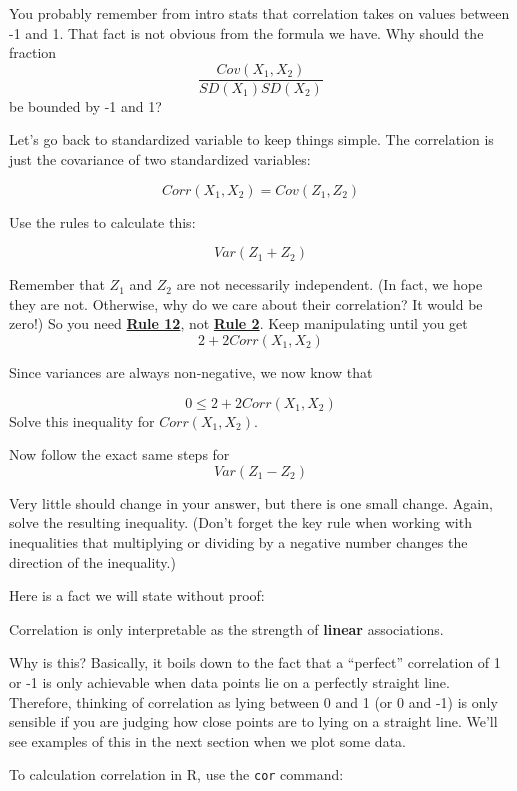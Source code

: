 \documentclass[
]{book}
\newenvironment{Shaded}{\begin{snugshade}}{\end{snugshade}}
\newcommand{\FunctionTok}[1]{\textcolor[rgb]{0.00,0.00,0.00}{#1}}
\newcommand{\NormalTok}[1]{#1}
\newcommand{\SpecialCharTok}[1]{\textcolor[rgb]{0.00,0.00,0.00}{#1}}
\begin{document}
You probably remember from intro stats that correlation takes on values between -1 and 1. That fact is not obvious from the formula we have. Why should the fraction
\[
\frac{Cov(X_{1},X_{2})}{SD(X_{1}) SD(X_{2})}
\]
be bounded by -1 and 1?

Let's go back to standardized variable to keep things simple. The correlation is just the covariance of two standardized variables:

\[
Corr(X_{1}, X_{2}) = Cov(Z_{1}, Z_{2})
\]

Use the rules to calculate this:

\[
Var(Z_{1} + Z_{2})
\]

Remember that \(Z_{1}\) and \(Z_{2}\) are not necessarily independent. (In fact, we hope they are not. Otherwise, why do we care about their correlation? It would be zero!) So you need \protect\hyperlink{Rule12}{\textbf{Rule 12}}, not \href{./variance.html\#Rule2}{\textbf{Rule 2}}. Keep manipulating until you get
\[
2 + 2Corr(X_{1}, X_{2})
\]

Since variances are always non-negative, we now know that

\[
0 \leq 2 + 2Corr(X_{1}, X_{2})
\]
Solve this inequality for \(Corr(X_{1}, X_{2})\).

Now follow the exact same steps for
\[
Var(Z_{1} - Z_{2})
\]

Very little should change in your answer, but there is one small change. Again, solve the resulting inequality. (Don't forget the key rule when working with inequalities that multiplying or dividing by a negative number changes the direction of the inequality.)

Here is a fact we will state without proof:

Correlation is only interpretable as the strength of \textbf{linear} associations.

Why is this? Basically, it boils down to the fact that a ``perfect'' correlation of 1 or -1 is only achievable when data points lie on a perfectly straight line. Therefore, thinking of correlation as lying between 0 and 1 (or 0 and -1) is only sensible if you are judging how close points are to lying on a straight line. We'll see examples of this in the next section when we plot some data.

To calculation correlation in R, use the \texttt{cor} command:

\begin{Shaded}
\end{Shaded}
\end{document}
